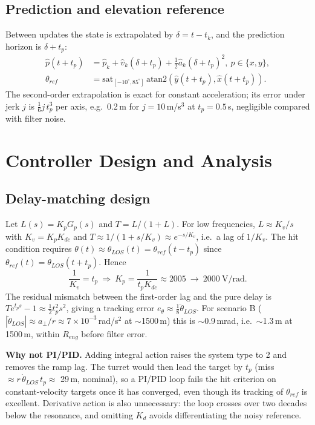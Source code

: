 \documentclass[10pt, conference]{IEEEtran}
\begin{document}
\subsection{Prediction and elevation reference}
Between updates the state is extrapolated by $\delta=t-t_k$, and the prediction horizon is $\delta+t_p$:
\begin{align}
\hat p(t{+}t_p)&=\hat p_k+\hat v_k(\delta+t_p)+\tfrac12\hat a_k(\delta+t_p)^2,\ p\in\{x,y\},\\
\theta_{ref}&=\text{sat}_{[-10^\circ,85^\circ]}\,\text{atan2}(\hat y(t{+}t_p),\hat x(t{+}t_p)).
\end{align}
The second-order extrapolation is exact for constant acceleration; its error under jerk $j$ is $\tfrac16 j\,t_p^3$ per axis, e.g.\ 0.2\,m for $j=10$\,m/s$^3$ at $t_p=0.5$\,s, negligible compared with filter noise.

\section{Controller Design and Analysis}\label{sec:ctrl}
\subsection{Delay-matching design}
Let $L(s)=K_pG_p(s)$ and $T=L/(1+L)$. For low frequencies, $L\approx K_v/s$ with $K_v=K_pK_{dc}$ and $T\approx 1/(1+s/K_v)\approx e^{-s/K_v}$, i.e.\ a lag of $1/K_v$. The hit condition requires $\theta(t)\approx\theta_{LOS}(t)=\theta_{ref}(t-t_p)$ since $\theta_{ref}(t)=\theta_{LOS}(t+t_p)$. Hence
\begin{equation}
\frac1{K_v}=t_p\ \Rightarrow\ K_p=\frac{1}{t_pK_{dc}}\approx2005\ \to\ 2000\ \text{V/rad}.
\end{equation}
The residual mismatch between the first-order lag and the pure delay is $T e^{t_ps}-1\approx\tfrac12t_p^2s^2$, giving a tracking error $e_\theta\approx\tfrac18\ddot\theta_{LOS}$. For scenario B ($|\ddot\theta_{LOS}|\approx a_\perp/r\approx7{\times}10^{-3}$\,rad/s$^2$ at $\sim$1500\,m) this is $\sim$0.9\,mrad, i.e.\ $\sim$1.3\,m at 1500\,m, within $R_{eng}$ before filter error. 

\textbf{Why not PI/PID.} Adding integral action raises the system type to 2 and removes the ramp lag. The turret would then lead the target by $t_p$ (miss $\approx r\,\dot\theta_{LOS}\,t_p\approx$ 29\,m, nominal), so a PI/PID loop fails the hit criterion on constant-velocity targets once it has converged, even though its tracking of $\theta_{ref}$ is excellent. Derivative action is also unnecessary: the loop crosses over two decades below the resonance, and omitting $K_d$ avoids differentiating the noisy reference.
\end{document}
